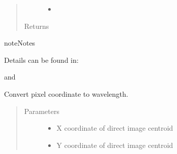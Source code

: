 \documentclass[a4paper,10pt,english]{sphinxmanual}
\begin{document}
\begin{fulllineitems}
\begin{fulllineitems}
\begin{quote}
\begin{description}
\begin{itemize}
\item {} 
 \textendash{} 

\end{itemize}

\item[{Returns}] \leavevmode
{}

\end{description}\end{quote}

\begin{sphinxadmonition}{note}{Notes}

Details can be found in:
\begin{quote}

\end{quote}

and
\begin{quote}

\end{quote}
\end{sphinxadmonition}

\end{fulllineitems}


\begin{fulllineitems}
\label{\detokenize{cascade.instruments:cascade.instruments.instruments.HSTWFC3._WFC3Dispersion}}
Convert pixel coordinate to wavelength.
\begin{quote}\begin{description}
\item[{Parameters}] \leavevmode\begin{itemize}
\item {} 
 \textendash{} X coordinate of direct image centroid

\item {} 
 \textendash{} Y coordinate of direct image centroid


\end{itemize}
\end{description}
\end{quote}
\end{fulllineitems}
\end{fulllineitems}
\end{document}
